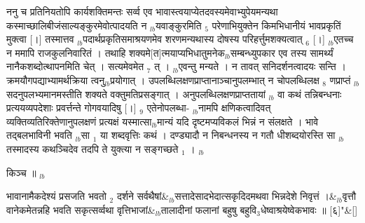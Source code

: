 \documentclass[article,12pt,a4paper]{memoir}%
\newcounter{parCount}
\begin{document}
	  
	  \pstart \leavevmode%
	ननु च प्रतिनियतोपि कार्यशक्तिमन्तः सर्व्व एव भावास्त्वयाप्येतदवस्यमेवाभ्युपेयमन्यथा कस्माच्छालिबीजंसाल्यङ्कुरमेवोत्पादयति न {\tiny $_{lb}$}यवाङ्कुरमिति {\tiny $_{5}$} परेणाभियुक्तेन किमभिधानीयं भावप्रकृतिं मुक्त्वा [।] तस्मात्तव {\tiny $_{lb}$}पदार्थप्रकृतिसमाश्रयणमेव शरणमन्यथास्य दोषस्य परिहर्त्तुमशक्यत्वात् {\tiny $_{6}$} [।] {\tiny $_{lb}$}एतच्च न ममापि राजकुलनिवारितं । तथाहि शक्यमे[त]त्मयाप्यभिधातुमनेक{\tiny $_{lb}$}सम्बन्ध्युपकार एव तस्य सामर्थ्यं नानैकशब्दोत्थापनमिति चेत् । सत्यमेवमेत {\tiny $_{7}$} त् । {\tiny $_{lb}$}एवन्तु मन्यते । न तावत् सनिदर्शनत्वादयः सन्ति । क्रमयौगपद्याभ्यामर्थक्रिया त्वनु{\tiny $_{lb}$}प्रयोगात् । उपलब्धिलक्षणप्राप्तानाञ्चानुपलम्भात् न चोपलब्धिलक्ष {\tiny $_{8}$} णप्राप्तं {\tiny $_{lb}$}सदनुपलभ्यमानमस्तीति शक्यते वक्तुमतिप्रसङ्गात् । अनुपलब्धिलक्षणप्राप्ततायां {\tiny $_{lb}$} \leavevmode{} वा कथं तन्निबन्धनाः प्रत्ययव्यपदेशाः प्रवर्त्तन्ते गोगवयादिषु [।] {\tiny $_{9}$} \leavevmode{} एतेनोपलब्धा- {\tiny $_{lb}$}नामपि क्षणिकत्वादिवत् व्यक्तिव्यतिरिक्तेणानुपलक्षणं प्रत्यक्षं यस्मात्सा{\tiny $_{lb}$}मान्यं यदि दृष्टमप्यविकलं भिन्नं न संलक्षते । भावे तद्बलभाविनी भवति {\tiny $_{lb}$}सा {\tiny $_{1}$} या शब्दवृत्तिः कथं । दण्ड्यादौ न निबन्धनस्य न गतौ धीशब्दयोरस्ति सा {\tiny $_{lb}$}तस्मादस्य कथञ्चिदेव तदपि ते युक्त्या न सङ्गच्छते {\tiny $_{1}$} ।
	{}
	\pend%
      {\tiny $_{lb}$}

	  
	  \pstart \leavevmode%
	किञ्च ॥
	{}
	\pend%
      {\tiny $_{lb}$}
	  \bigskip
	  \begingroup
	
	    
	    \stanza[\smallbreak]
	  भावानामैकदेश्यं प्रसजति भवतो {\tiny $_{2}$} दर्शने सर्वथैषां&{\tiny $_{lb}$}सत्तादेसादभेदात्सकृदिदमथवा भिन्नदेशे निवृत्तं ।&{\tiny $_{lb}$}वृत्तौ वानेकमेतन्नहि भवति सकृत्सर्व्वथा वृत्तिभाजां&{\tiny $_{lb}$}तालादीनां फलानां बहुषु बहुवि{\tiny $_{3}$}धेष्वाश्रयेष्वेकभावः ॥ [६]{\normalfontlatin\large\qquad{}"}\&[\smallbreak]
	  
\end{document}
